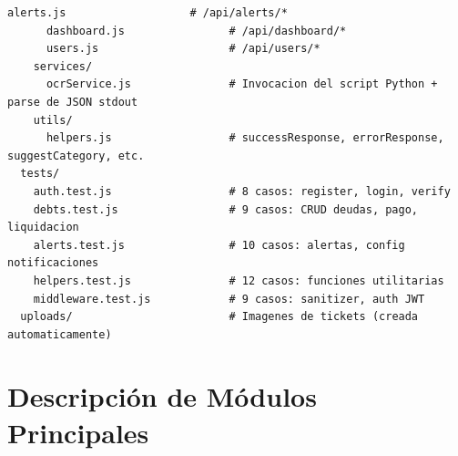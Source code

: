 \begin{lstlisting}[style=bash, caption={Árbol de directorios del backend FINARA}, label={lst:tree}]
      alerts.js                   # /api/alerts/*
      dashboard.js                # /api/dashboard/*
      users.js                    # /api/users/*
    services/
      ocrService.js               # Invocacion del script Python + parse de JSON stdout
    utils/
      helpers.js                  # successResponse, errorResponse, suggestCategory, etc.
  tests/
    auth.test.js                  # 8 casos: register, login, verify
    debts.test.js                 # 9 casos: CRUD deudas, pago, liquidacion
    alerts.test.js                # 10 casos: alertas, config notificaciones
    helpers.test.js               # 12 casos: funciones utilitarias
    middleware.test.js            # 9 casos: sanitizer, auth JWT
  uploads/                        # Imagenes de tickets (creada automaticamente)
\end{lstlisting}

\section{Descripción de Módulos Principales}

